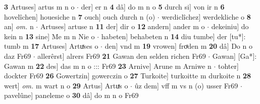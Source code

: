 \documentclass[8pt,a4paper,notitlepage]{article}
\begin{document}
\begin{table}[ht]
\begin{minipage}[t]{0.5\linewidth}
\textbf{3} Artuses] artus m n o  $\cdot$ der] er n \textbf{4} dâ] do m n o \textbf{5} durch si] von ir n \textbf{6} hovelîchen] houesiche n \textbf{7} ouch] ouch durch n (o)  $\cdot$ werdiclîchez] werdekliche o \textbf{8} an] \textit{om.} n  $\cdot$ Artuses] artuse n \textbf{11} der] dir o \textbf{12} andern] ander m o  $\cdot$ dekeiniu] do kein n \textbf{13} sine] Me m n Nie o  $\cdot$ habeten] behabeten n \textbf{14} diu tumbe] der [tu*]: tumb m \textbf{17} Artuses] Artuͯses o  $\cdot$ den] vnd m \textbf{19} vrowen] froͯden m \textbf{20} dâ] Do n o daz Fr69  $\cdot$ allerêrst] alrers Fr69 \textbf{21} Gawan den selden richen Fr69  $\cdot$ Gawan] [Ga*]: Gawan m \textbf{22} des] das m n o ::: Fr69 \textbf{23} Arnive] Arune m Arniwe n  $\cdot$ tohter] dockter Fr69 \textbf{26} Gowertzin] gowerczin o \textbf{27} Turkoite] turkoitte m durkoite n \textbf{28} wert] \textit{om.} m wart n o \textbf{29} Artus] Artuͯs o  $\cdot$ ûz dem] vff m vs n (o) usser Fr69  $\cdot$ pavelûne] paneleme o \textbf{30} dâ] do m n o Fr69 \newline
\end{minipage}
\end{table}
\newpage
\end{document}

